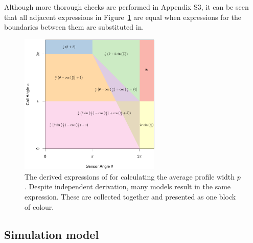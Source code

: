 \documentclass[a4paper,10pt,reqno,oneside]{amsart}
\begin{document}
Although more thorough checks are performed in Appendix S3, it can be seen that all adjacent expressions in Figure~\ref{f:equalModelResults} are equal when expressions for the boundaries between them are substituted in.

\begin{figure}
\centering
\includegraphics[width=0.6\textwidth]{imgs/equalModelResults.pdf}
\caption{The derived expressions of for calculating the average profile width $p$. Despite independent derivation, many models result in the same expression. These are collected together and presented as one block of colour.}
\label{f:equalModelResults}
\end{figure}



\subsection{Simulation model}
\end{document}
